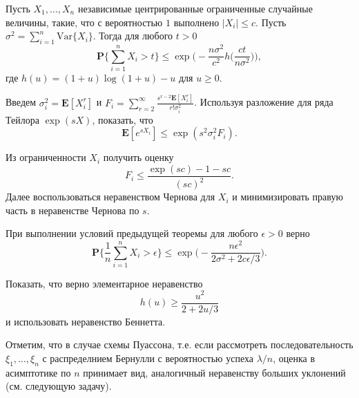 \begin{problem}
Пусть $X_1,\dots, X_n$ независимые центрированные ограниченные случайные величины, такие, что с вероятностью $1$ выполнено $|X_i|\leq c$.
Пусть $\sigma^2 = \sum_{i=1}^n\text{Var}\{X_i\}$.
 Тогда для любого $t>0$ 
\begin{equation*}
\mathbf{P}\bigg\{\sum_{i=1}^n X_i>t\biggr\}\leq \exp\bigg(-\frac{n\sigma^2}{c^2}h\bigg(\frac{ct}{n\sigma^2}\biggr)\biggr),
\end{equation*}
где $h(u) = (1+u)\log(1+u)-u$ для $u\geq 0$.
\end{problem}
\begin{remark}
Введем $\sigma_i^2 = \mathbf{E}[X_i^r]$ и $F_i = \sum_{r=2}^{\infty}\frac{s^{r-2}\mathbf{E}[X_i^r]}{r!\sigma_i^2}$.
Используя разложение для ряда Тейлора $\exp(sX)$, показать, что 
\begin{equation*}
\mathbf{E}[e^{sX_i}]\leq \exp(s^2\sigma^2_iF_i).
\end{equation*}

Из ограниченности  $X_i$ получить оценку
\begin{equation*}
F_i\leq \frac{\exp(sc)-1-sc}{(sc)^2}.
\end{equation*} 
Далее воспользоваться неравенством Чернова для $X_i$ и минимизировать правую часть в неравенстве Чернова по $s$.
\end{remark}

\begin{problem}
При выполнении условий предыдущей теоремы для любого  $\epsilon>0$ верно 
\begin{equation*}
\mathbf{P}\bigg\{\frac{1}{n}\sum_{i=1}^n X_i>\epsilon\biggr\}\leq \exp\bigg(-\frac{n\epsilon^2}{2\sigma^2+2c\epsilon/3}\biggr).
\end{equation*}
\end{problem}

\begin{remark} 
Показать, что верно элементарное неравенство 
\begin{equation*}
h(u)\geq \frac{u^2}{2+2u/3}
\end{equation*}
и использовать неравенство Беннетта.

Отметим, что в случае схемы Пуассона, т.е. если рассмотреть последовательность $\xi_1,\dots,\xi_n$ с распределнием Бернулли с вероятностью успеха $\lambda/n$,   оценка в асимптотике по $n$ принимает вид, аналогичный  неравенству больших уклонений (см. следующую задачу).
\end{remark}

